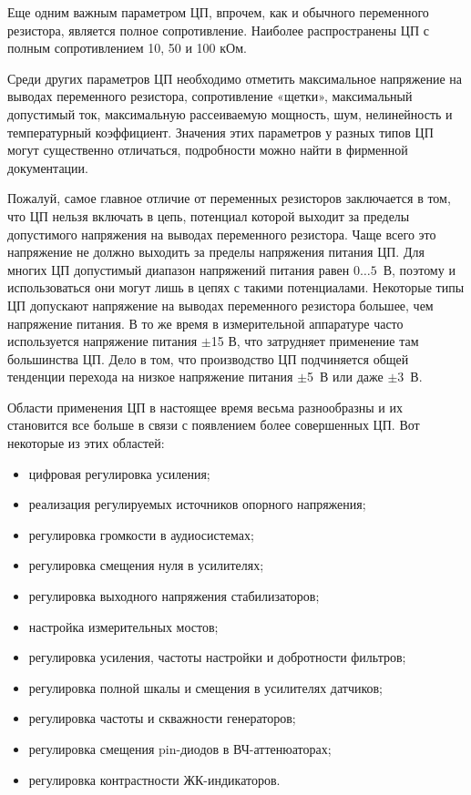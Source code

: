 Еще одним важным параметром ЦП, впрочем, как и обычного переменного резистора, является полное сопротивление. Наиболее распространены ЦП с полным сопротивлением 10, 50 и 100 кОм.

Среди других параметров ЦП необходимо отметить максимальное напряжение на выводах переменного резистора, сопротивление «щетки», максимальный допустимый ток, максимальную рассеиваемую мощность, шум, нелинейность и температурный коэффициент. Значения этих параметров у разных типов ЦП могут существенно отличаться, подробности можно найти в фирменной документации.

Пожалуй, самое главное отличие от переменных резисторов заключается в том, что ЦП нельзя включать в цепь, потенциал которой выходит за пределы допустимого напряжения на выводах переменного резистора. Чаще всего это напряжение не должно выходить за пределы напряжения питания ЦП. Для многих ЦП допустимый диапазон напряжений питания равен $ 0\ldots5 $~В, поэтому и использоваться они могут лишь в цепях с такими потенциалами. Некоторые типы ЦП допускают напряжение на выводах переменного резистора большее, чем напряжение питания. В то же время в измерительной аппаратуре часто используется напряжение питания $ \pm $15 В, что затрудняет применение там большинства ЦП. Дело в том, что производство ЦП подчиняется общей тенденции перехода на низкое напряжение питания $ \pm $5~В или даже $ \pm $3~В. 

Области применения ЦП в настоящее время весьма разнообразны и их становится все больше в связи с появлением более совершенных ЦП. Вот некоторые из этих областей:
\begin{itemize}
	\item цифровая регулировка усиления; 
	\item реализация регулируемых источников опорного напряжения; 
	\item регулировка громкости в аудиосистемах; 
	\item регулировка смещения нуля в усилителях; 
	\item регулировка выходного напряжения стабилизаторов; 
	\item настройка измерительных мостов; 
	\item регулировка усиления, частоты настройки и добротности фильтров; 
	\item регулировка полной шкалы и смещения в усилителях датчиков; 
	\item регулировка частоты и скважности генераторов; 
	\item регулировка смещения pin-диодов в ВЧ-аттенюаторах; 
	\item регулировка контрастности ЖК-индикаторов. 
\end{itemize}


